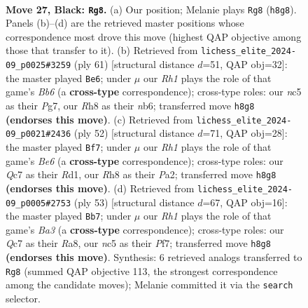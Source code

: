 \documentclass[11pt]{article}
\begin{document}
\clearpage

\begin{figure}[p]\centering
\begin{subfigure}{0.46\textwidth}\centering
\resizebox{\linewidth}{!}{%
\newchessgame
\chessboard[
  setfen={r1k4r/p1q2p1p/2p5/2N5/3Q4/3P4/b4PPP/2R3K1 b - - 0 27},
  showmover=false,
  pgfstyle=straightmove, color=movearrow, markmove={h8-g8}
]}
\caption{}
\end{subfigure}\hfill
\begin{subfigure}{0.46\textwidth}\centering
\resizebox{\linewidth}{!}{%
\newchessgame
\chessboard[
  setfen={3r1k2/5pp1/1N1q3p/PQp5/8/1b5P/5PP1/4R1K1 b - - 0 31},
  showmover=false,
  pgfstyle=straightmove, color=movearrow, markmove={b3-e6}
]}
\caption{}
\end{subfigure}
\\[4pt]
\begin{subfigure}{0.46\textwidth}\centering
\resizebox{\linewidth}{!}{%
\newchessgame
\chessboard[
  setfen={4r2k/pp4pp/2pQBn2/8/8/8/PqP2PPP/3R2K1 w - - 5 27},
  showmover=false,
  pgfstyle=straightmove, color=movearrow, markmove={e6-f7}
]}
\caption{}
\end{subfigure}\hfill
\begin{subfigure}{0.46\textwidth}\centering
\resizebox{\linewidth}{!}{%
\newchessgame
\chessboard[
  setfen={r5k1/5p2/b1p3p1/Q1P4p/1N1pq3/P7/5PPP/2R3K1 b - - 1 27},
  showmover=false,
  pgfstyle=straightmove, color=movearrow, markmove={a6-b7}
]}
\caption{}
\end{subfigure}
\caption{\textbf{Move 27, Black: \texttt{Rg8}.} (a) Our position; Melanie plays \texttt{Rg8} (\texttt{h8g8}). Panels (b)--(d) are the retrieved master positions whose correspondence most drove this move (highest QAP objective among those that transfer to it). (b) Retrieved from \texttt{lichess\_elite\_2024-09\_p0025\#3259} (ply 61) [structural distance $d$=51, QAP obj=32]: the master played \texttt{Be6}; under $\mu$ our \emph{Rh1} plays the role of that game's \emph{Bb6} (a \textbf{cross-type} correspondence); cross-type roles: our \emph{n}c5 as their \emph{P}g7, our \emph{R}h8 as their \emph{n}b6; transferred move \texttt{h8g8} \textbf{(endorses this move)}. (c) Retrieved from \texttt{lichess\_elite\_2024-09\_p0021\#2436} (ply 52) [structural distance $d$=71, QAP obj=28]: the master played \texttt{Bf7}; under $\mu$ our \emph{Rh1} plays the role of that game's \emph{Be6} (a \textbf{cross-type} correspondence); cross-type roles: our \emph{Q}c7 as their \emph{R}d1, our \emph{R}h8 as their \emph{P}a2; transferred move \texttt{h8g8} \textbf{(endorses this move)}. (d) Retrieved from \texttt{lichess\_elite\_2024-09\_p0005\#2753} (ply 53) [structural distance $d$=67, QAP obj=16]: the master played \texttt{Bb7}; under $\mu$ our \emph{Rh1} plays the role of that game's \emph{Ba3} (a \textbf{cross-type} correspondence); cross-type roles: our \emph{Q}c7 as their \emph{R}a8, our \emph{n}c5 as their \emph{P}f7; transferred move \texttt{h8g8} \textbf{(endorses this move)}. Synthesis: 6 retrieved analogs transferred to \texttt{Rg8} (summed QAP objective 113, the strongest correspondence among the candidate moves); Melanie committed it via the \texttt{search} selector.}
\label{fig:thought-m53}
\end{figure}
\end{document}
